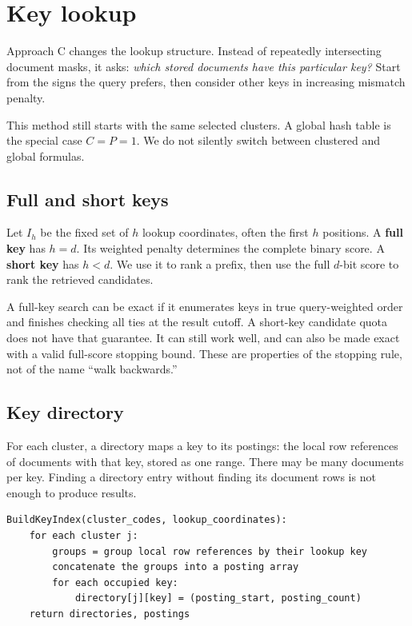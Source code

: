 \section{Key lookup}
\label{sec:keys}
Approach C changes the lookup structure. Instead of repeatedly intersecting document masks,
it asks: \emph{which stored documents have this particular key?} Start from the signs the query
prefers, then consider other keys in increasing mismatch penalty.

This method still starts with the same selected clusters. A global hash table is
the special case $C=P=1$. We do not silently switch between clustered and global formulas.


\subsection{Full and short keys}
Let $I_h$ be the fixed set of $h$ lookup coordinates, often the first $h$ positions. A
\textbf{full key} has $h=d$. Its weighted penalty determines the complete binary score.
A \textbf{short key} has $h<d$. We use it to rank a prefix, then use the full $d$-bit score to rank the
retrieved candidates.

A full-key search can be exact if it enumerates keys in true query-weighted order and finishes
checking all ties at the result cutoff. A short-key candidate quota does not have that guarantee. It can still
work well, and can also be made exact with a valid full-score stopping bound. These are
properties of the stopping rule, not of the name ``walk backwards.''

\subsection{Key directory}
For each cluster, a directory maps a key to its postings: the local row references of
documents with that key, stored as one range. There may be many documents per key. Finding a directory entry
without finding its document rows is not enough to produce results.

\par\noindent\begin{minipage}{\linewidth}
\begin{lstlisting}[caption={Build a clustered key index.}]
BuildKeyIndex(cluster_codes, lookup_coordinates):
    for each cluster j:
        groups = group local row references by their lookup key
        concatenate the groups into a posting array
        for each occupied key:
            directory[j][key] = (posting_start, posting_count)
    return directories, postings
\end{lstlisting}
\end{minipage}\par


